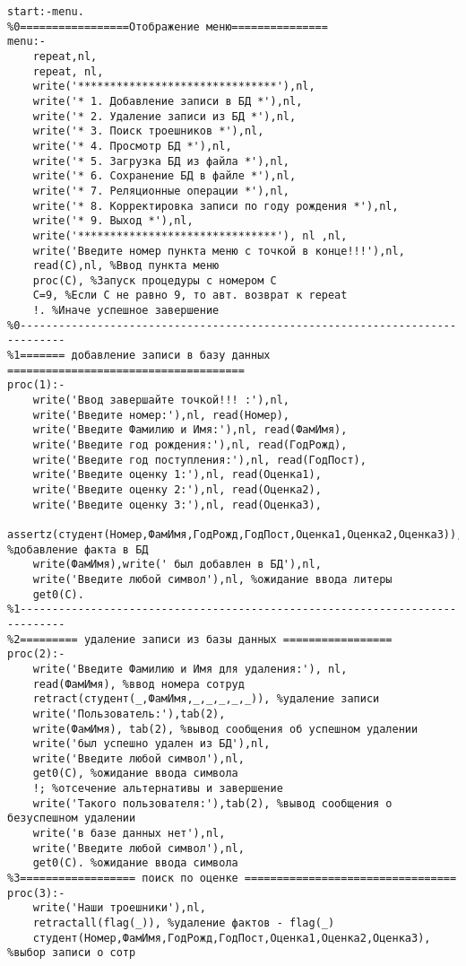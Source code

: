 \documentclass[a4paper,14pt]{extarticle}
\begin{document}
\begin{lstlisting}
start:-menu.
%0=================Отображение меню===============
menu:-
    repeat,nl,
    repeat, nl,
    write('*******************************'),nl,
    write('* 1. Добавление записи в БД *'),nl,
    write('* 2. Удаление записи из БД *'),nl,
    write('* 3. Поиск троешников *'),nl,
    write('* 4. Просмотр БД *'),nl,
    write('* 5. Загрузка БД из файла *'),nl,
    write('* 6. Сохранение БД в файле *'),nl,
    write('* 7. Реляционные операции *'),nl,
    write('* 8. Корректировка записи по году рождения *'),nl,
    write('* 9. Выход *'),nl,
    write('*******************************'), nl ,nl,
    write('Введите номер пункта меню с точкой в конце!!!'),nl,
    read(C),nl, %Ввод пункта меню
    proc(C), %Запуск процедуры с номером С
    C=9, %Если С не равно 9, то авт. возврат к repeat
    !. %Иначе успешное завершение
%0-----------------------------------------------------------------------------
%1======= добавление записи в базу данных =====================================
proc(1):-
    write('Ввод завершайте точкой!!! :'),nl,
    write('Введите номер:'),nl, read(Номер),
    write('Введите Фамилию и Имя:'),nl, read(ФамИмя),
    write('Введите год рождения:'),nl, read(ГодРожд),
    write('Введите год поступления:'),nl, read(ГодПост),
    write('Введите оценку 1:'),nl, read(Оценка1),
    write('Введите оценку 2:'),nl, read(Оценка2),
    write('Введите оценку 3:'),nl, read(Оценка3),
    assertz(студент(Номер,ФамИмя,ГодРожд,ГодПост,Оценка1,Оценка2,Оценка3)), %добавление факта в БД
    write(ФамИмя),write(' был добавлен в БД'),nl,
    write('Введите любой символ'),nl, %ожидание ввода литеры
    get0(C).
%1-----------------------------------------------------------------------------
%2========= удаление записи из базы данных =================
proc(2):-
    write('Введите Фамилию и Имя для удаления:'), nl,
    read(ФамИмя), %ввод номера сотруд
    retract(студент(_,ФамИмя,_,_,_,_,_)), %удаление записи
    write('Пользователь:'),tab(2),
    write(ФамИмя), tab(2), %вывод сообщения об успешном удалении
    write('был успешно удален из БД'),nl,
    write('Введите любой символ'),nl,
    get0(C), %ожидание ввода символа
    !; %отсечение альтернативы и завершение
    write('Такого пользователя:'),tab(2), %вывод сообщения о безуспешном удалении
    write('в базе данных нет'),nl,
    write('Введите любой символ'),nl,
    get0(C). %ожидание ввода символа
%3================== поиск по оценке =================================
proc(3):-
    write('Наши троешники'),nl,
    retractall(flag(_)), %удаление фактов - flag(_)
    студент(Номер,ФамИмя,ГодРожд,ГодПост,Оценка1,Оценка2,Оценка3), %выбор записи о сотр

\end{lstlisting}
\end{document}
